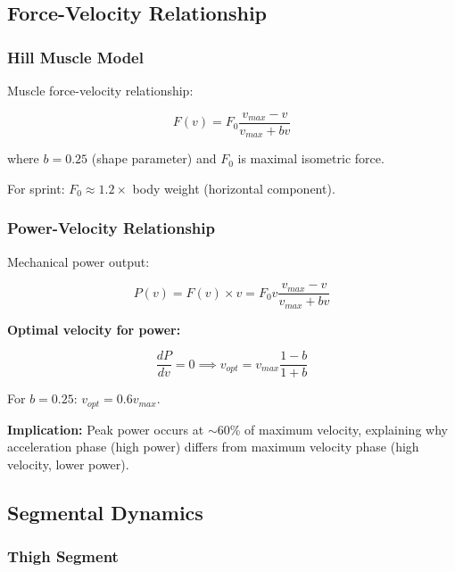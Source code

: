 \subsection{Force-Velocity Relationship}

\subsubsection{Hill Muscle Model}

Muscle force-velocity relationship:

\begin{equation}
F(v) = F_0 \frac{v_{max} - v}{v_{max} + b v}
\label{eq:hill_force_velocity}
\end{equation}

where $b = 0.25$ (shape parameter) and $F_0$ is maximal isometric force.

For sprint: $F_0 \approx 1.2 \times$ body weight (horizontal component).

\subsubsection{Power-Velocity Relationship}

Mechanical power output:

\begin{equation}
P(v) = F(v) \times v = F_0 v \frac{v_{max} - v}{v_{max} + b v}
\label{eq:power_velocity}
\end{equation}

\textbf{Optimal velocity for power:}

\begin{equation}
\frac{dP}{dv} = 0 \implies v_{opt} = v_{max} \frac{1 - b}{1 + b}
\label{eq:optimal_power_velocity}
\end{equation}

For $b = 0.25$: $v_{opt} = 0.6 v_{max}$.

\textbf{Implication:} Peak power occurs at $\sim$60\% of maximum velocity, explaining why acceleration phase (high power) differs from maximum velocity phase (high velocity, lower power).

\subsection{Segmental Dynamics}

\subsubsection{Thigh Segment}

